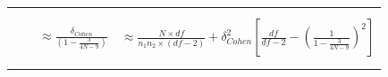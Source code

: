 \documentclass[
  man,floatsintext]{apa6}
\begin{document}
\begin{landscape}
\begin{longtable}[]{@{}lccc@{}}
\begin{minipage}[t]{0.42\columnwidth}
\end{minipage}\tabularnewline
\begin{minipage}[t]{0.12\columnwidth}\raggedright
\strut
\end{minipage} & \begin{minipage}[t]{0.11\columnwidth}\centering
\strut
\end{minipage} & \begin{minipage}[t]{0.24\columnwidth}\centering
\strut
\end{minipage} & \begin{minipage}[t]{0.42\columnwidth}\centering
\strut
\end{minipage}\tabularnewline
\begin{minipage}[t]{0.12\columnwidth}\raggedright
\strut
\end{minipage} & \begin{minipage}[t]{0.11\columnwidth}\centering
\strut
\end{minipage} & \begin{minipage}[t]{0.24\columnwidth}\centering
\(\approx \frac{\delta_{Cohen}}{\left(1-\frac{3}{4N-9}\right)}\)\strut
\end{minipage} & \begin{minipage}[t]{0.42\columnwidth}\centering
\(\approx \frac{N\times df}{n_1n_2 \times (df-2)} + \delta^2_{Cohen} \left[ \frac{df}{df-2} - \left( \frac{1}{1-\frac{3}{4N-9} }\right)^2\right]\)\strut
\end{minipage}\tabularnewline
\begin{minipage}[t]{0.12\columnwidth}\raggedright
\strut
\end{minipage} & \begin{minipage}[t]{0.11\columnwidth}\centering
\strut
\end{minipage} & \begin{minipage}[t]{0.24\columnwidth}\centering
\strut
\end{minipage} & \begin{minipage}[t]{0.42\columnwidth}\centering
\strut
\end{minipage}\tabularnewline
\begin{minipage}[t]{0.12\columnwidth}\raggedright
\strut
\end{minipage} & \begin{minipage}[t]{0.11\columnwidth}\centering
\strut
\end{minipage} & \begin{minipage}[t]{0.24\columnwidth}\centering
\strut
\end{minipage} & \begin{minipage}[t]{0.42\columnwidth}\centering

\end{minipage}
\end{longtable}
\end{landscape}
\end{document}
